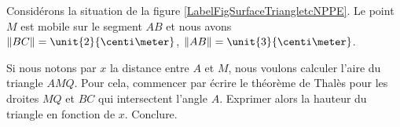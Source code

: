 
\begin{exercice}\label{exoSeconde-0044}

    Considérons la situation de la figure \ref{LabelFigSurfaceTriangletcNPPE}. Le point $M$ est mobile sur le segment \( AB\) et nous avons \( \| BC \|=\unit{2}{\centi\meter}\), \( \| AB \|=\unit{3}{\centi\meter}\).

    Si nous notons par \( x\) la distance entre \( A\) et \( M\), nous voulons calculer l'aire du triangle \( AMQ\). Pour cela, commencer par écrire le théorème de Thalès pour les droites \( MQ\) et \( BC\) qui intersectent l'angle \( A\). Exprimer alors la hauteur du triangle en fonction de \( x\). Conclure.

    \newcommand{\CaptionFigSurfaceTriangletcNPPE}{La figure de l'exercice \ref{exoSeconde-0044}.}


\end{exercice}
